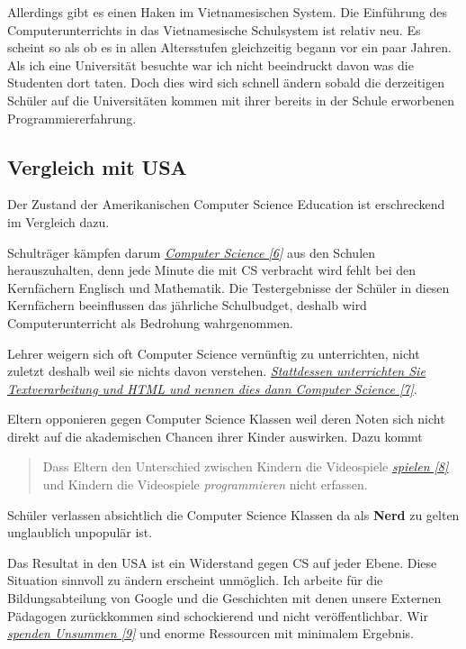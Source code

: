 Allerdings gibt es einen Haken im Vietnamesischen System. Die Einführung des Computerunterrichts in das Vietnamesische Schulsystem ist relativ neu. Es scheint so als ob es in allen Altersstufen gleichzeitig begann vor ein paar Jahren. Als ich eine Universität besuchte war ich nicht beeindruckt davon was die Studenten dort taten. Doch dies wird sich schnell ändern sobald die derzeitigen Schüler auf die Universitäten kommen mit ihrer bereits in der Schule erworbenen Programmiererfahrung.

\subsection*{Vergleich mit USA}
Der Zustand der Amerikanischen Computer Science Education ist erschreckend im Vergleich dazu.

Schulträger kämpfen darum \href{http://www.marylandpublicschools.org/MSDE/programs/esea/docs/TQ_Regulations/core_subjects.htm}{\textit{Computer Science [6]}} aus den Schulen herauszuhalten, denn jede Minute die mit CS verbracht wird fehlt bei den Kernfächern Englisch und Mathematik. Die Testergebnisse der Schüler in diesen Kernfächern beeinflussen das jährliche Schulbudget, deshalb wird Computerunterricht als Bedrohung wahrgenommen.

Lehrer weigern sich oft Computer Science vernünftig zu unterrichten, nicht zuletzt deshalb weil sie nichts davon verstehen.  \href{http://blog.carolynworks.com/?p=572}{\textit{Stattdessen unterrichten Sie Textverarbeitung und HTML und nennen dies dann Computer Science [7]}}.

Eltern opponieren gegen Computer Science Klassen weil deren Noten sich nicht direkt auf die akademischen Chancen ihrer Kinder auswirken. Dazu kommt  
\large 
\begin{quote}
\glqq 
Dass Eltern den Unterschied zwischen Kindern die Videospiele \href{http://www.youtube.com/watch?v=Lql-otlQfNo}{\textit{spielen [8]}} und Kindern die Videospiele \emph{programmieren} nicht erfassen.
\grqq
\end{quote}
\normalsize 
Schüler verlassen absichtlich die Computer Science Klassen da als \textbf{Nerd} zu gelten unglaublich unpopulär ist.

Das Resultat in den USA ist ein Widerstand gegen CS auf jeder Ebene. Diese Situation sinnvoll zu ändern erscheint unmöglich. Ich arbeite für die Bildungsabteilung von Google und die Geschichten mit denen unsere Externen Pädagogen zurückkommen sind schockierend und nicht veröffentlichbar. Wir \href{http://neil.fraser.name/news/2011/07/16/}{\textit{spenden Unsummen [9]}} und enorme Ressourcen mit minimalem Ergebnis.

